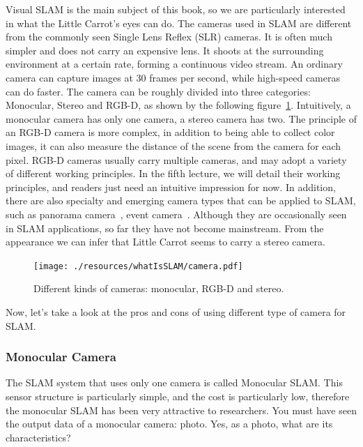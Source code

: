 Visual SLAM is the main subject of this book, so we are particularly interested in what the Little Carrot's eyes can do. The cameras used in SLAM are different from the commonly seen Single Lens Reflex (SLR) cameras. It is often much simpler and does not carry an expensive lens. It shoots at the surrounding environment at a certain rate, forming a continuous video stream. An ordinary camera can capture images at 30 frames per second, while high-speed cameras can do faster. The camera can be roughly divided into three categories: Monocular, Stereo and RGB-D, as shown by the following figure~\ref{fig:cameras}. Intuitively, a monocular camera has only one camera, a stereo camera has two. The principle of an RGB-D camera is more complex, in addition to being able to collect color images, it can also measure the distance of the scene from the camera for each pixel. RGB-D cameras usually carry multiple cameras, and may adopt a variety of different working principles. In the fifth lecture, we will detail their working principles, and readers just need an intuitive impression for now. In addition, there are also specialty and emerging camera types that can be applied to SLAM, such as panorama camera~\cite{Pretto2011}, event camera~\cite{Rueckauer2016}. Although they are occasionally seen in SLAM applications, so far they have not become mainstream. From the appearance we can infer that Little Carrot seems to carry a stereo camera.

\begin{figure}
	\centering
	\texttt{[image: ./resources/whatIsSLAM/camera.pdf]}
	\caption{Different kinds of cameras: monocular, RGB-D and stereo. }
	\label{fig:cameras}
\end{figure}

Now, let's take a look at the pros and cons of using different type of camera for SLAM\@.

\subsubsection{Monocular Camera}

The SLAM system that uses only one camera is called Monocular SLAM. This sensor structure is particularly simple, and the cost is particularly low, therefore the monocular SLAM has been very attractive to researchers. You must have seen the output data of a monocular camera: photo. Yes, as a photo, what are its characteristics?

